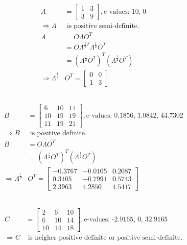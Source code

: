 \documentclass{article}
\theoremstyle{definition} %
\begin{document}
\begin{align*}
	A &=
	\begin{bmatrix}
		1 & 3\\ 3 & 9
	\end{bmatrix}, \text{e-values: 10, 0}
	\\
	\Rightarrow A & \text{ is positive semi-definite.}
	\\
	A & = O\Lambda O^T \\
	&= O\Lambda^{\frac{1}{2}T} \Lambda^{\frac{1}{2}} O^T\\
	&= (\Lambda^{\frac{1}{2}} O^T)^T(\Lambda^{\frac{1}{2}} O^T)\\
	\Rightarrow \Lambda^{\frac{1}{2}} &O^T = 
	\begin{bmatrix}
		0 & 0 \\ 1 & 3
	\end{bmatrix}
\end{align*}

\subsection{}

\begin{align*}
	B &=
	\begin{bmatrix}
		6 & 10 & 11\\
		10 & 19 & 19\\
		11 & 19 & 21
	\end{bmatrix}, \text{e-values: 0.1856, 1.0842, 44.7302}
	\\
	\Rightarrow B & \text{ is positive definite.}
	\\
	B & = O\Lambda O^T \\
	&= (\Lambda^{\frac{1}{2}} O^T)^T(\Lambda^{\frac{1}{2}} O^T)\\
	\Rightarrow \Lambda^{\frac{1}{2}} &O^T = 
	\left[\begin{array}{ccc}
		-0.3767 & -0.0105 & 0.2087 \\
		0.3405 & -0.7991 & 0.5743 \\
		2.3963 & 4.2850 & 4.5417
	\end{array}\right]
\end{align*}

\subsection{}

\begin{align*}
	C &=
	\begin{bmatrix}
		2 & 6 & 10\\
		6 & 10 & 14\\
		10 & 14 & 18
	\end{bmatrix}, \text{e-values: -2.9165, 0, 32.9165}
	\\
	\Rightarrow C & \text{ is neigher positive definite or positive semi-definite.}
\end{align*}
\end{document}
